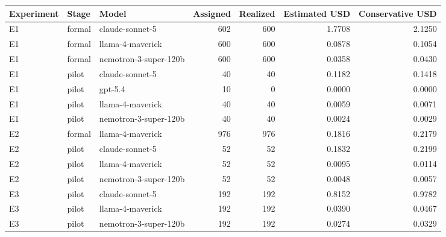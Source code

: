 \begin{tabular}{lllrrrr}
\toprule
Experiment & Stage & Model & Assigned & Realized & Estimated USD & Conservative USD \\
\midrule
E1 & formal & claude-sonnet-5 & 602 & 600 & 1.7708 & 2.1250 \\
E1 & formal & llama-4-maverick & 600 & 600 & 0.0878 & 0.1054 \\
E1 & formal & nemotron-3-super-120b & 600 & 600 & 0.0358 & 0.0430 \\
E1 & pilot & claude-sonnet-5 & 40 & 40 & 0.1182 & 0.1418 \\
E1 & pilot & gpt-5.4 & 10 & 0 & 0.0000 & 0.0000 \\
E1 & pilot & llama-4-maverick & 40 & 40 & 0.0059 & 0.0071 \\
E1 & pilot & nemotron-3-super-120b & 40 & 40 & 0.0024 & 0.0029 \\
E2 & formal & llama-4-maverick & 976 & 976 & 0.1816 & 0.2179 \\
E2 & pilot & claude-sonnet-5 & 52 & 52 & 0.1832 & 0.2199 \\
E2 & pilot & llama-4-maverick & 52 & 52 & 0.0095 & 0.0114 \\
E2 & pilot & nemotron-3-super-120b & 52 & 52 & 0.0048 & 0.0057 \\
E3 & pilot & claude-sonnet-5 & 192 & 192 & 0.8152 & 0.9782 \\
E3 & pilot & llama-4-maverick & 192 & 192 & 0.0390 & 0.0467 \\
E3 & pilot & nemotron-3-super-120b & 192 & 192 & 0.0274 & 0.0329 \\
\bottomrule
\end{tabular}
